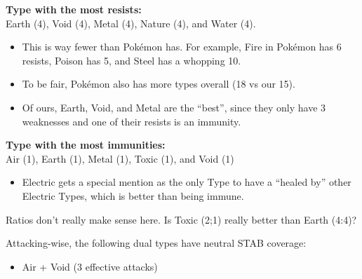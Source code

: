 \begin{itemize}
	\item{\textbf{Type with the most resists:}\\Earth (4), Void (4), Metal (4), Nature (4), and Water (4).
		\begin{itemize}
			\item{This is way fewer than Pok\'{e}mon has. For example, Fire in Pok\'{e}mon has 6 resists, Poison has 5, and Steel has a whopping 10.}
			\item{To be fair, Pok\'{e}mon also has more types overall (18 vs our 15).}
			\item{Of ours, Earth, Void, and Metal are the ``best'', since they only have 3 weaknesses and one of their resists is an immunity.}
		\end{itemize}
		\item{\textbf{Type with the most immunities:}\\Air (1), Earth (1), Metal (1), Toxic (1), and Void (1)
			\begin{itemize}
				\item{Electric gets a special mention as the only Type to have a ``healed by'' other Electric Types, which is better than being immune.}
			\end{itemize}
		}
	}
	\item{Ratios don't really make sense here. Is Toxic (2;1) really better than Earth (4:4)?}
\end{itemize}


Attacking-wise, the following dual types have neutral STAB coverage:
\begin{itemize}
	\item{Air + Void (3 effective attacks)}
\end{itemize}


